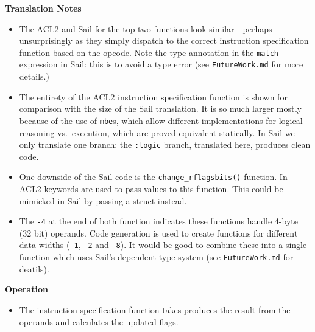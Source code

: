 \documentclass[a4paper]{article}
\begin{document}
\begin{tcolorbox}[breakable]
\textbf{Translation Notes}

\begin{itemize}
  \item The ACL2 and Sail for the top two functions look similar - perhaps unsurprisingly as they simply dispatch to the correct instruction specification function based on the opcode.  Note the type annotation in the \texttt{match} expression in Sail: this is to avoid a type error (see \texttt{FutureWork.md} for more details.)

  \item The entirety of the ACL2 instruction specification function is shown for comparison with the size of the Sail translation.  It is so much larger mostly because of the use of \texttt{mbe}s, which allow different implementations for logical reasoning vs.~execution, which are proved equivalent statically.  In Sail we only translate one branch: the \texttt{:logic} branch, translated here, produces clean code.

  \item One downside of the Sail code is the \texttt{change\_rflagsbits()} function.  In ACL2 keywords are used to pass values to this function.  This could be mimicked in Sail by passing a struct instead.

  \item The \texttt{-4} at the end of both function indicates these functions handle 4-byte (32 bit) operands.  Code generation is used to create functions for different data widths (\texttt{-1}, \texttt{-2} and \texttt{-8}).  It would be good to combine these into a single function which uses Sail's dependent type system (see \texttt{FutureWork.md} for deatils).
\end{itemize}

\textbf{Operation}
\begin{itemize}
  \item The instruction specification function takes produces the result from the operands and calculates the updated flags.
\end{itemize}

\end{tcolorbox}
\end{document}

